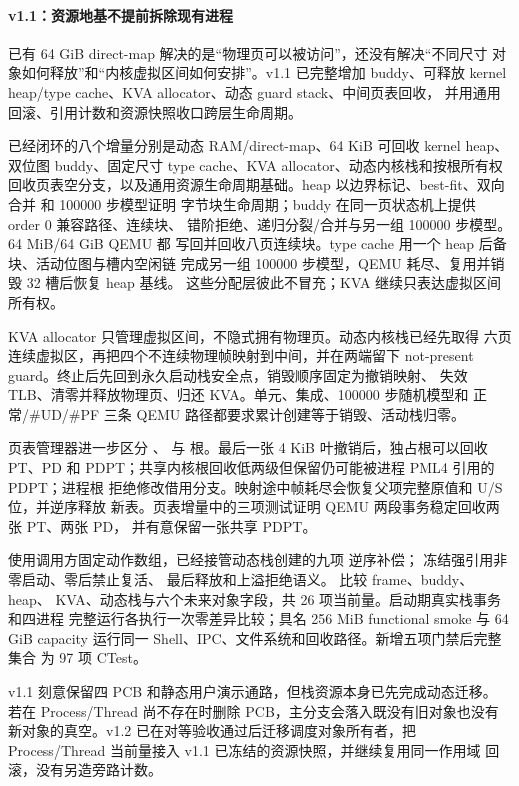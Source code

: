 \paragraph{v1.1：资源地基不提前拆除现有进程}

已有 64 GiB direct-map 解决的是“物理页可以被访问”，还没有解决“不同尺寸
对象如何释放”和“内核虚拟区间如何安排”。v1.1 已完整增加 buddy、可释放
kernel heap/type cache、KVA allocator、动态 guard stack、中间页表回收，
并用通用回滚、引用计数和资源快照收口跨层生命周期。

已经闭环的八个增量分别是动态 RAM/direct-map、64 KiB 可回收 kernel heap、
双位图 buddy、固定尺寸 type cache、KVA allocator、动态内核栈和按根所有权
回收页表空分支，以及通用资源生命周期基础。heap
以边界标记、best-fit、双向合并
和 100000 步模型证明
字节块生命周期；buddy 在同一页状态机上提供 order 0 兼容路径、连续块、
错阶拒绝、递归分裂/合并与另一组 100000 步模型。64 MiB/64 GiB QEMU 都
写回并回收八页连续块。type cache 用一个 heap 后备块、活动位图与槽内空闲链
完成另一组 100000 步模型，QEMU 耗尽、复用并销毁 32 槽后恢复 heap 基线。
这些分配层彼此不冒充；KVA 继续只表达虚拟区间所有权。

KVA allocator 只管理虚拟区间，不隐式拥有物理页。动态内核栈已经先取得
六页连续虚拟区，再把四个不连续物理帧映射到中间，并在两端留下
not-present guard。终止后先回到永久启动栈安全点，销毁顺序固定为撤销映射、
失效 TLB、清零并释放物理页、归还 KVA。单元、集成、100000 步随机模型和
正常/\#UD/\#PF 三条 QEMU 路径都要求累计创建等于销毁、活动栈归零。

页表管理器进一步区分 、 与
 根。最后一张 4 KiB 叶撤销后，独占根可以回收 PT、PD 和
PDPT；共享内核根回收低两级但保留仍可能被进程 PML4 引用的 PDPT；进程根
拒绝修改借用分支。映射途中帧耗尽会恢复父项完整原值和 U/S 位，并逆序释放
新表。页表增量中的三项测试证明 QEMU 两段事务稳定回收两张 PT、两张 PD，
并有意保留一张共享 PDPT。

 使用调用方固定动作数组，已经接管动态栈创建的九项
逆序补偿； 冻结强引用非零启动、零后禁止复活、
最后释放和上溢拒绝语义。 比较 frame、buddy、heap、
KVA、动态栈与六个未来对象字段，共 26 项当前量。启动期真实栈事务和四进程
完整运行各执行一次零差异比较；具名 256 MiB functional smoke 与 64 GiB
capacity 运行同一 Shell、IPC、文件系统和回收路径。新增五项门禁后完整集合
为 97 项 CTest。

v1.1 刻意保留四 PCB 和静态用户演示通路，但栈资源本身已先完成动态迁移。
若在 Process/Thread 尚不存在时删除 PCB，主分支会落入既没有旧对象也没有
新对象的真空。v1.2 已在对等验收通过后迁移调度对象所有者，把
Process/Thread 当前量接入 v1.1 已冻结的资源快照，并继续复用同一作用域
回滚，没有另造旁路计数。

